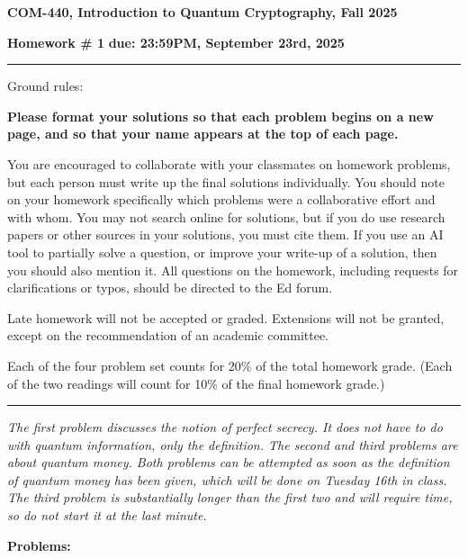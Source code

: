 \documentclass[12pt]{article}
\newcommand{\header}[1]{\begin{center} {\large\bf #1} \end{center}}
\begin{document}
\header{COM-440, Introduction to Quantum Cryptography, Fall 2025}
{\bf Homework \# 1} \hfill {\bf due: 23:59PM, September 23rd, 2025}


\medskip

\hrule

\medskip 

Ground rules: 

{\bf Please
  format your solutions so that each problem begins on a new page, and
  so that your name appears at the top of each page.}

You are encouraged to collaborate with your classmates on
homework problems, but each person must write up the final solutions
individually. You should note on your homework specifically which
problems were a collaborative effort and with whom. You may not search
online for solutions, but if you do use research papers or other
sources in your solutions, you must cite them. If you use an AI tool to 
partially solve a question, or improve your write-up of a solution, then 
you should also mention it. All questions on the homework, including requests for clarifications or typos, should be directed to the Ed forum.

Late homework will not be accepted or graded. Extensions will not be granted, except on the recommendation of an academic committee. 

Each of the four problem set counts for 20\% of the total homework grade. (Each of the two readings will count for 10\% of the final homework grade.)

\medskip

\hrule

 
\medskip

\emph{The first problem discusses the notion of perfect secrecy. It does not have to do with quantum information, only the definition. The second and third problems are about quantum money. Both problems can be attempted as soon as the definition of quantum money has been given, which will be done on Tuesday 16th in class. The third problem is substantially longer than the first two and will require time, so do not start it at the last minute.}


{\bf Problems:}
\end{document}
